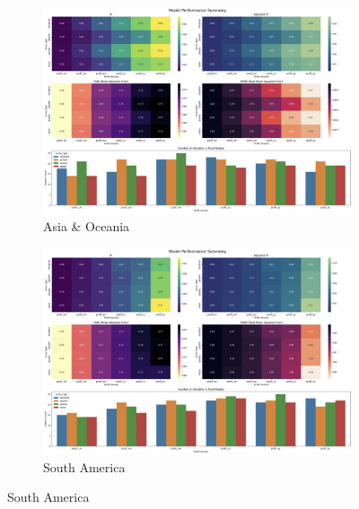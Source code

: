 \documentclass[11pt,english,a4paper,hidelinks]{book}
\begin{document}
\begin{figure}[H]
    \begin{subfigure}[b]{0.48\textwidth}
        \centering
        \includegraphics[width=\textwidth]{images/code/models/linear_regression/second_model/AS - performance.png}
        \caption{Asia \& Oceania}
    \end{subfigure}
    \hfill
    \begin{subfigure}[b]{0.48\textwidth}
        \centering
        \includegraphics[width=\textwidth]{images/code/models/linear_regression/second_model/LAT - performance.png}
        \caption{South America}
    \end{subfigure}
    \hfill
    
    \vspace{0.5cm}
    

\end{figure}
\end{document}
